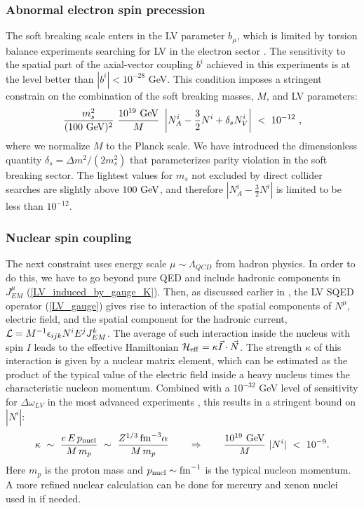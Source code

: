 \documentclass[12pt]{revtex4}
\begin{document}
\subsubsection*{Abnormal electron spin precession}


The soft  breaking scale enters in the LV parameter $b_\mu$, which is 
limited by torsion balance experiments searching for LV in the
electron sector \cite{Heckel:1999sy}. The sensitivity to the spatial
part of the axial-vector  
coupling $b^i$ achieved in this experiments is at the level better
than $|b^i| < 10^{-28}$ GeV. This condition imposes a stringent
constrain on the combination of the soft breaking masses, 
$M$, and LV parameters:
%
\begin{equation}
\frac{m_{s}^2}{(100~{\rm GeV})^2}~
\frac {10^{19}~{\rm GeV}}{M} ~ 
\left| N_A^i - \frac{3}{2} N^i + \delta_{s} N_V^i \right |
~<~10^{-12}~, 
\label{b_limit}
\end{equation}
%
where we normalize $M$ to the Planck scale. We have introduced the
dimensionless quantity  
$\delta_s = \Delta m^2/(2m_s^2)$ that parameterizes parity violation
in the soft breaking sector. The lightest values for $m_s$ not
excluded by direct collider searches are slightly above 
$100~{\rm GeV}$, and therefore $|N_A^i - \frac{3}{2} N^i |$ is limited
to be less than $10^{-12}$.  


\subsubsection*{Nuclear spin coupling}


The next constraint uses energy scale $\mu \sim \Lambda_{QCD}$ from
hadron physics. In order to do this, we have to go beyond pure QED and
include hadronic components in $J^\mu_{EM}$
(\ref{LV_induced_by_gauge_K}). Then, as discussed earlier in  
\cite{GrootNibbelink:2004za}, the LV SQED operator (\ref{LV_gauge})
gives rise to interaction of the spatial components of $N^\mu$,
electric field, and the spatial component  
for the hadronic current, ${\cal L} = M^{-1}\epsilon_{ijk} N^i E^j J_{EM}^k$.
The average of such interaction inside the nucleus with spin $I$ leads to 
the effective Hamiltonian 
$\mathcal{H}_{\rm eff}= \kappa \vec I\cdot \vec N$.
The strength $\kappa$ of this interaction is given by a nuclear matrix
element, which can be estimated as the product of the typical value of 
the electric field inside a heavy nucleus times the characteristic  
nucleon momentum. Combined with a $10^{-32}$ GeV level of sensitivity
for  $\Delta \omega_{LV}$ in the most advanced experiments
\cite{clock1,clock2}, this results in a stringent bound on $|N^i|$:
%
\begin{equation}
\kappa ~\sim~ \frac{e\, E \, p_{\rm nucl}}{M\, m_p} 
~\sim~ \frac{Z^{1/3}\, {\rm fm}^{-3}\alpha}{M \,m_p} 
\qquad \Rightarrow \qquad
\frac {10^{19}~{\rm GeV}}{M} ~ |N^i| ~<~ 10^{-9}.
\label{N_limit_nucl}
\end{equation}
%
Here $m_p$ is the proton mass and $p_{\rm nucl}\sim {\rm fm}^{-1}$ is
the typical nucleon momentum. A more refined nuclear calculation can
be done for mercury and xenon nuclei used in \cite{clock1,clock2} if needed.
\end{document}
